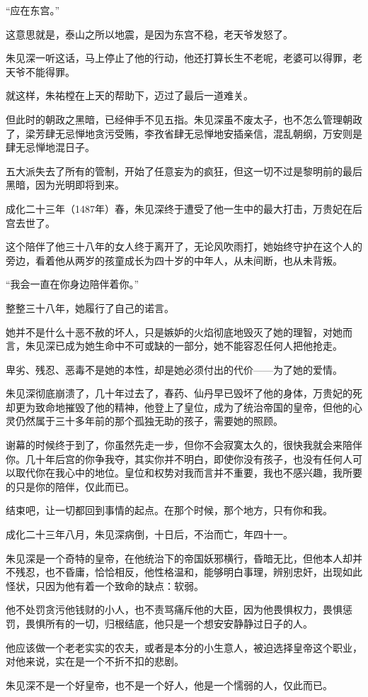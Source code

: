 \begin{multicols}{\theparacolNo}
		“应在东宫。”

		这意思就是，泰山之所以地震，是因为东宫不稳，老天爷发怒了。

		朱见深一听这话，马上停止了他的行动，他还打算长生不老呢，老婆可以得罪，老天爷不能得罪。

		就这样，朱祐樘在上天的帮助下，迈过了最后一道难关。

		但此时的朝政之黑暗，已经伸手不见五指。朱见深虽不废太子，也不怎么管理朝政了，梁芳肆无忌惮地贪污受贿，李孜省肆无忌惮地安插亲信，混乱朝纲，万安则是肆无忌惮地混日子。

		五大派失去了所有的管制，开始了任意妄为的疯狂，但这一切不过是黎明前的最后黑暗，因为光明即将到来。

		成化二十三年（1487年）春，朱见深终于遭受了他一生中的最大打击，万贵妃在后宫去世了。

		这个陪伴了他三十八年的女人终于离开了，无论风吹雨打，她始终守护在这个人的旁边，看着他从两岁的孩童成长为四十岁的中年人，从未间断，也从未背叛。

		“我会一直在你身边陪伴着你。”

		整整三十八年，她履行了自己的诺言。

		她并不是什么十恶不赦的坏人，只是嫉妒的火焰彻底地毁灭了她的理智，对她而言，朱见深已成为她生命中不可或缺的一部分，她不能容忍任何人把他抢走。

		卑劣、残忍、恶毒不是她的本性，却是她必须付出的代价——为了她的爱情。

		朱见深彻底崩溃了，几十年过去了，春药、仙丹早已毁坏了他的身体，万贵妃的死却更为致命地摧毁了他的精神，他登上了皇位，成为了统治帝国的皇帝，但他的心灵仍然属于三十多年前的那个孤独无助的孩子，需要她的照顾。

		谢幕的时候终于到了，你虽然先走一步，但你不会寂寞太久的，很快我就会来陪伴你。几十年后宫的你争我夺，其实你并不明白，即使你没有孩子，也没有任何人可以取代你在我心中的地位。皇位和权势对我而言并不重要，我也不感兴趣，我所要的只是你的陪伴，仅此而已。

		结束吧，让一切都回到事情的起点。在那个时候，那个地方，只有你和我。

		成化二十三年八月，朱见深病倒，十日后，不治而亡，年四十一。

		朱见深是一个奇特的皇帝，在他统治下的帝国妖邪横行，昏暗无比，但他本人却并不残忍，也不昏庸，恰恰相反，他性格温和，能够明白事理，辨别忠奸，出现如此怪状，只因为他有着一个致命的缺点：软弱。

		他不处罚贪污他钱财的小人，也不责骂痛斥他的大臣，因为他畏惧权力，畏惧惩罚，畏惧所有的一切，归根结底，他只是一个想安安静静过日子的人。

		他应该做一个老老实实的农夫，或者是本分的小生意人，被迫选择皇帝这个职业，对他来说，实在是一个不折不扣的悲剧。

		朱见深不是一个好皇帝，也不是一个好人，他是一个懦弱的人，仅此而已。
		\ifnum{}
	\end{multicols}
\fi
\newpage
